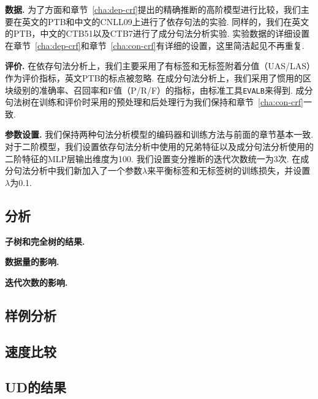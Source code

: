 \noindent\textbf{数据.}
为了方面和章节~\ref{cha:dep-crf}提出的精确推断的高阶模型进行比较，我们主要在英文的PTB和中文的CNLL09上进行了依存句法的实验.
同样的，我们在英文的PTB，中文的CTB51以及CTB7进行了成分句法分析实验.
实验数据的详细设置在章节~\ref{cha:dep-crf}和章节~\ref{cha:con-crf}有详细的设置，这里简洁起见不再重复.

\noindent\textbf{评价.}
在依存句法分析上，我们主要采用了有标签和无标签附着分值（UAS/LAS）作为评价指标，英文PTB的标点被忽略.
在成分句法分析上，我们采用了惯用的区块级别的准确率、召回率和F值（P/R/F）的指标，由标准工具\texttt{EVALB}来得到.
成分句法树在训练和评价时采用的预处理和后处理行为我们保持和章节~\ref{cha:con-crf}一致.

\noindent\textbf{参数设置.}
我们保持两种句法分析模型的编码器和训练方法与前面的章节基本一致.
对于二阶模型，我们设置依存句法分析中使用的兄弟特征以及成分句法分析使用的二阶特征的MLP层输出维度为100.
我们设置变分推断的迭代次数统一为3次.
在成分句法分析中我们新加入了一个参数$\lambda$来平衡标签和无标签树的训练损失，并设置$\lambda$为0.1.



\subsection{分析}

\noindent\textbf{子树和完全树的结果.}

\noindent\textbf{数据量的影响.}

\noindent\textbf{迭代次数的影响.}

\subsection{样例分析}

\subsection{速度比较}

\subsection{UD的结果}
